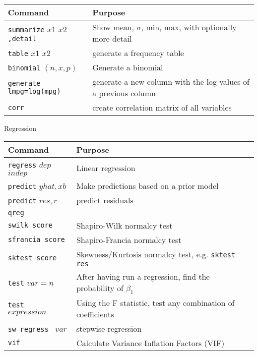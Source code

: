 \documentclass[11pt, oneside]{article}   	%
\begin{document}
\begin{tabular}{l p{ } }
Command & Purpose \\
\hline
\texttt{summarize} $x1$ $x2$\texttt{,detail} & Show mean, $\sigma$, min, max, with optionally more detail\\

\texttt{table} $x1$ $x2$ & generate a frequency table \\

\texttt{binomial} $(n,x,p)$ & Generate a binomial \\

\texttt{generate lmpg=log(mpg)} & generate a new column with the log values of a previous column \\

\texttt{corr} & create correlation matrix of all variables \\

\end{tabular}



\begin{center}
\large{Regression}
\end{center}

\begin{tabular}{l p{ } }
Command & Purpose \\
\hline
\texttt{regress} $dep$ $indep$ & Linear regression \\ 

\texttt{predict} $yhat, xb$ & Make predictions based on a prior model \\

\texttt{predict} $res, r$ & predict residuals \\

\texttt{qreg} &  \\

\texttt{swilk score} & Shapiro-Wilk normalcy test \\

\texttt{sfrancia score} & Shapiro-Francia normalcy test \\

\texttt{sktest score} & Skewness/Kurtosis normalcy test, e.g. \texttt{sktest res} \\

\texttt{test} $var=n$ & After having run a regression, find the probability of $\beta_1$ \\

\texttt{test } $expression$ & Using the F statistic, test any combination of coefficients \\

\texttt{sw regress } $var$ & stepwise regression\\

\texttt{vif}  & Calculate Variance Inflation Factors (VIF) \\


\end{tabular}
\end{document}
